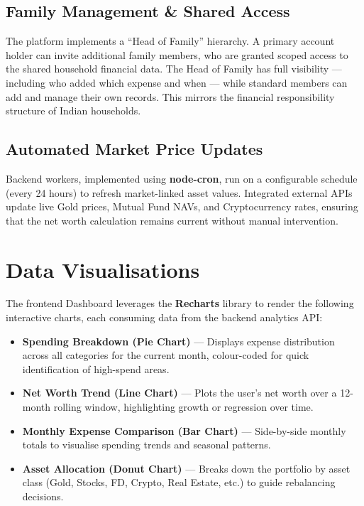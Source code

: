 \documentclass[12pt,a4paper]{article}
\begin{document}
\subsection{Family Management \& Shared Access}
The platform implements a ``Head of Family'' hierarchy. A primary account holder can invite additional family members, who are granted scoped access to the shared household financial data. The Head of Family has full visibility — including who added which expense and when — while standard members can add and manage their own records. This mirrors the financial responsibility structure of Indian households.

\subsection{Automated Market Price Updates}
Backend workers, implemented using \textbf{node-cron}, run on a configurable schedule (every 24 hours) to refresh market-linked asset values. Integrated external APIs update live Gold prices, Mutual Fund NAVs, and Cryptocurrency rates, ensuring that the net worth calculation remains current without manual intervention.

\section{Data Visualisations}
\label{sec:viz}

The frontend Dashboard leverages the \textbf{Recharts} library to render the following interactive charts, each consuming data from the backend analytics API:

\begin{itemize}[noitemsep, leftmargin=*]
  \item \textbf{Spending Breakdown (Pie Chart)} --- Displays expense distribution across all categories for the current month, colour-coded for quick identification of high-spend areas.
  \item \textbf{Net Worth Trend (Line Chart)} --- Plots the user's net worth over a 12-month rolling window, highlighting growth or regression over time.
  \item \textbf{Monthly Expense Comparison (Bar Chart)} --- Side-by-side monthly totals to visualise spending trends and seasonal patterns.
  \item \textbf{Asset Allocation (Donut Chart)} --- Breaks down the portfolio by asset class (Gold, Stocks, FD, Crypto, Real Estate, etc.) to guide rebalancing decisions.
\end{itemize}
\end{document}
